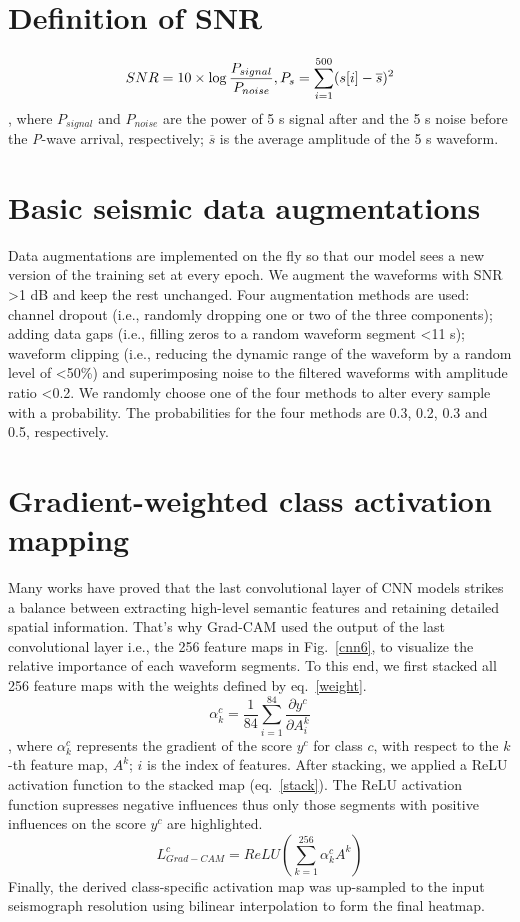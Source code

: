 \documentclass{gji}
\begin{document}
\appendix
\section{Definition of SNR}
\begin{equation}
\label{snr}
SNR=10\times\log{\frac{P_{signal}}{P_{noise}}},\\
P_s=\sum_{i=1}^{500}(s[i]-\overline{s})^2
\end{equation}
, where $P_{signal}$ and $P_{noise}$ are the power of 5 s signal after and the 5 s noise before the \textit{P}-wave arrival, respectively; $\overline{s}$ is the average amplitude of the 5 s waveform.

\section{Basic seismic data augmentations}
\label{data_aug}
Data augmentations are implemented on the fly so that our model sees a new version of the training set at every epoch. We augment the waveforms with SNR \textgreater{1} dB and keep the rest unchanged. Four augmentation methods are used: channel dropout (i.e., randomly dropping one or two of the three components); adding data
gaps (i.e., filling zeros to a random waveform segment \textless{11} s); waveform clipping (i.e., reducing the dynamic range of the waveform by a random level of \textless{50}\%) and superimposing noise to the filtered waveforms with amplitude ratio \textless{0.2}. We randomly choose one of the four methods to alter every sample with a probability. The probabilities for the four methods are 0.3, 0.2, 0.3 and 0.5, respectively.

\section{Gradient-weighted class activation mapping}
\label{cam_appendix}
Many works have proved that the last convolutional layer of CNN models strikes a balance between extracting high-level semantic features and retaining detailed spatial information. That's why Grad-CAM \citep{cam} used the output of the last convolutional layer i.e., the 256 feature maps in Fig.~\ref{cnn6}, to visualize the relative importance of each waveform segments. To this end, we first stacked all 256 feature maps with the weights defined by eq.~\ref{weight}.
\begin{equation}
\label{weight}
\alpha_k^c=\frac{1}{84}\sum_{i=1}^{84}\frac{\partial y^c}{\partial A_i^k}
\end{equation}
, where $\alpha_k^c$ represents the gradient of the score $y^c$ for class $c$, with respect to the $k$-th feature map, $A^k$; $i$ is the index of features.
After stacking, we applied a ReLU activation function to the stacked map (eq.~\ref{stack}). The ReLU activation function supresses negative influences thus only those segments with positive influences on the score $y^c$ are highlighted.
\begin{equation}
\label{stack}
L_{Grad-CAM}^c=ReLU(\sum_{k=1}^{256}\alpha_k^cA^k)
\end{equation}
Finally, the derived class-specific activation map was up-sampled to the input seismograph resolution using bilinear interpolation to form the final heatmap.

\label{lastpage}
\end{document}
